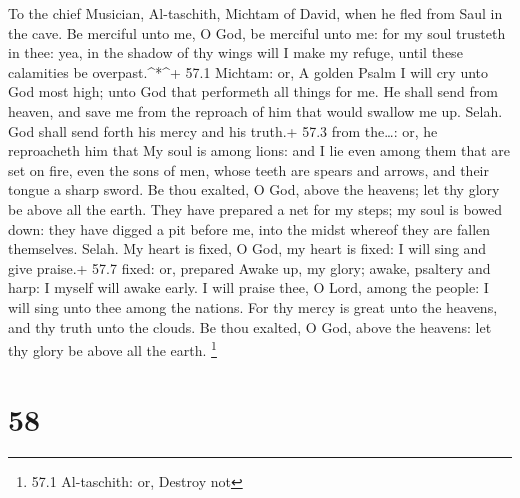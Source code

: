 To the chief Musician, Al-taschith, Michtam of David, when he fled from
Saul in the cave.  Be merciful unto me, O God, be merciful
unto me: for my soul trusteth in thee: yea, in the shadow of thy wings
will I make my refuge, until these calamities be overpast.\^{}*\^{}+
57.1 Michtam: or, A golden Psalm  I will cry unto God most
high; unto God that performeth all things for me.  He shall
send from heaven, and save me from the reproach of him that would
swallow me up. Selah. God shall send forth his mercy and his truth.+
57.3 from the\ldots: or, he reproacheth him that  My soul is
among lions: and I lie even among them that are set on fire, even the
sons of men, whose teeth are spears and arrows, and their tongue a sharp
sword.  Be thou exalted, O God, above the heavens; let thy
glory be above all the earth.  They have prepared a net for
my steps; my soul is bowed down: they have digged a pit before me, into
the midst whereof they are fallen themselves. Selah.  My
heart is fixed, O God, my heart is fixed: I will sing and give praise.+
57.7 fixed: or, prepared  Awake up, my glory; awake,
psaltery and harp: I myself will awake early.  I will praise
thee, O Lord, among the people: I will sing unto thee among the nations.
 For thy mercy is great unto the heavens, and thy truth
unto the clouds.  Be thou exalted, O God, above the
heavens: let thy glory be above all the earth. \footnote{57.1
  Al-taschith: or, Destroy not}

\hypertarget{section-57}{%
\section{58}\label{section-57}}


